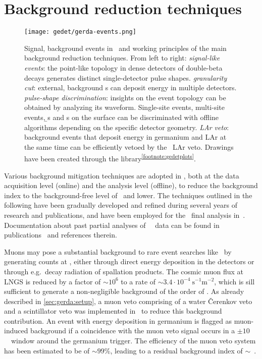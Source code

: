 \section{Background reduction techniques}%
\label{sec:gerda:cuts}

\begin{figure}
  \centering
  \texttt{[image: gedet/gerda-events.png]}
  \caption{%
    Signal, background events in \gerda\ and working principles of the main background
    reduction techniques. From left to right: \emph{signal-like events}: the point-like
    topology in dense detectors of double-beta decays generates distinct single-detector
    pulse shapes. \emph{granularity cut}: external, background \g{}s can deposit energy
    in multiple detectors. \emph{pulse-shape discrimination}: insights on the event
    topology can be obtained by analyzing its waveform. Single-site events, multi-site
    events, \b{}s and \a{}s on the surface can be discriminated with offline algorithms
    depending on the specific detector geometry. \emph{LAr veto}: background events that
    deposit energy in germanium and LAr at the same time can be efficiently vetoed by
    the \gerda\ LAr veto. Drawings have been
    created through the  library\textsuperscript{\ref{footnote:gedetplots}}.
  }\label{fig:gerda:event-types}
\end{figure}

Various background mitigation techniques are adopted in \gerda, both at the data
acquisition level (online) and the analysis level (offline), to reduce the background
index to the background-free level of \pIIbi\ and lower. The techniques outlined in the
following have been gradually developed and refined during several years of research and
publications, and have been employed for the \phasetwo\ final analysis
in~\cite{Kermaidic2020, Agostini2021}.  Documentation about past partial analyses of
\gerda\ \phasetwo\ data can be found in publications~\cite{Agostini2015a, Agostini2017,
Agostini2018, Agostini2019a} and references therein.

Muons may pose a substantial background to rare event searches like \gerda\ by generating
counts at \qbb, either through direct energy deposition in the detectors or through
e.g.~decay radiation of spallation products. The cosmic muon flux at LNGS is reduced by a
factor of ${\sim}10^6$ to a rate of ${\sim}3.4 \cdot 10^{−4}~\text{s}^{-1}\text{m}^{-2}$,
which is sill sufficient to generate a non-negligible background of the order of
.  As already described in \cref{sec:gerda:setup}, a muon veto comprising of
a water \v{C}erenkov veto and a scintillator veto was implemented in \gerda\ to reduce
this background contribution. An event with energy deposition in germanium is flagged
as muon-induced background if a coincidence with the muon veto signal occurs in a $\pm
10$~\mus\ window around the germanium trigger. The efficiency of the muon veto system
has been estimated to be of ${\sim}99$\%, leading to a residual background index of
${\sim}$~\cite{Freund2016}.

